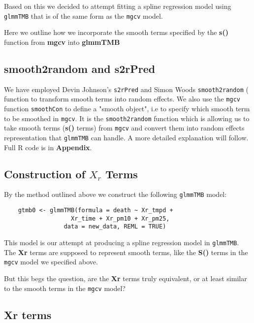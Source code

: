 Based on this we decided to attempt fitting a spline regression model using \texttt{glmmTMB} that is of the same form as the \texttt{mgcv} model.
\newline

Here we outline how we incorporate the smooth terms specified by the \textbf{s()} function from \textbf{mgcv} into \textbf{glmmTMB}

\subsection{smooth2random and s2rPred}

We have employed Devin Johnson's \texttt{s2rPred} and Simon Woods \texttt{smooth2random} (\cite{wood2017} function to transform smooth terms into random effects. We also use the \texttt{mgcv} function \texttt{smoothCon} to define a "smooth object", i.e to specify which smooth term to be smoothed in \texttt{mgcv}. It is the \texttt{smooth2random} function which is allowing us to take smooth terms (\textbf{s()} terms) from \texttt{mgcv} and convert them into random effects representation that \texttt{glmmTMB} can handle. A more detailed explanation will follow. Full R code is in \textbf{Appendix}. 



\subsection{Construction of \(X_r\) Terms}

By the method outlined above we construct the following \texttt{glmmTMB} model:

\begin{verbatim}
    gtmb0 <- glmmTMB(formula = death ~ Xr_tmpd + 
                   Xr_time + Xr_pm10 + Xr_pm25, 
                 data = new_data, REML = TRUE)
\end{verbatim}

This model is our attempt at producing a spline regression model in \texttt{glmmTMB}. The \textbf{Xr} terms are supposed to represent smooth terms, like the \textbf{S()} terms in the \texttt{mgcv} model we specified above. 
\newline

But this begs the question, are the \textbf{Xr} terms truly equivalent, or at least similar to the smooth terms in the \texttt{mgcv} model? 

\subsection{Xr terms}


